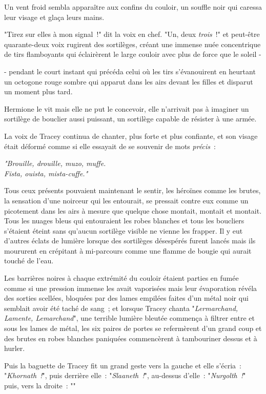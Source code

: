Un vent froid sembla apparaître aux confins du couloir, un souffle noir qui caressa leur visage et glaça leurs mains.

"Tirez sur elles à mon signal~!" dit la voix en chef. "Un, deux \emph{trois}~!" et peut-être quarante-deux voix rugirent des sortilèges, créant une immense nuée concentrique de tirs flamboyants qui éclairèrent le large couloir avec plus de force que le soleil -

- pendant le court instant qui précéda celui où les tirs s'évanouirent en heurtant un octogone rouge sombre qui apparut dans les airs devant les filles et disparut un moment plus tard.

Hermione le vit mais elle ne put le concevoir, elle n'arrivait pas à imaginer un sortilège de bouclier aussi puissant, un sortilège capable de résister à une armée.

La voix de Tracey continua de chanter, plus forte et plus confiante, et son visage était déformé comme si elle essayait de se souvenir de mots \emph{précis}~:

\emph{"Brouille, drouille, muzo, muffe.\\
Fista, ouista, mista-cuffe."}

Tous ceux présents pouvaient maintenant le sentir, les héroïnes comme les brutes, la sensation d'une noirceur qui les entourait, se pressait contre eux comme un picotement dans les airs à mesure que quelque chose montait, montait et montait. Tous les nuages bleus qui entouraient les robes blanches et tous les boucliers s'étaient éteint sans qu'aucun sortilège visible ne vienne les frapper. Il y eut d'autres éclats de lumière lorsque des sortilèges désespérés furent lancés mais ils moururent en crépitant à mi-parcours comme une flamme de bougie qui aurait touché de l'eau.

Les barrières noires à chaque extrémité du couloir étaient parties en fumée comme si une pression immense les avait vaporisées mais leur évaporation révéla des sorties scellées, bloquées par des lames empilées faites d'un métal noir qui semblait avoir été taché de sang~; et lorsque Tracey chanta "\emph{Lermarchand, Lamente, Lemarchand}", une terrible lumière bleutée commença à filtrer entre et sous les lames de métal, les six paires de portes se refermèrent d'un grand coup et des brutes en robes blanches paniquées commencèrent à tambouriner dessus et à hurler.

Puis la baguette de Tracey fit un grand geste vers la gauche et elle s'écria~: "\emph{Khornath~!}", puis derrière elle~: "\emph{Slaaneth~!}", au-dessus d'elle~: "\emph{Nurgolth~!}" puis, vers la droite~: ""

